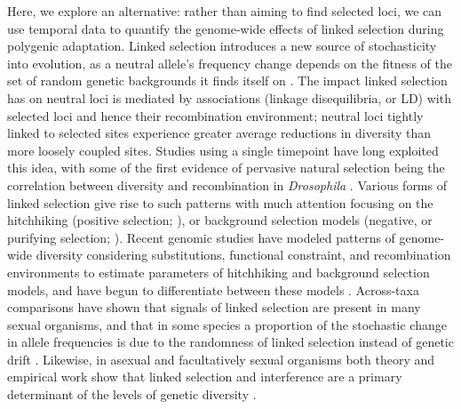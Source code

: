 \documentclass[11pt]{article}
\begin{document}
Here, we explore an alternative: rather than aiming to find selected loci, we
can use temporal data to quantify the genome-wide effects of linked selection
during polygenic adaptation. Linked selection introduces a new source of
stochasticity into evolution, as a neutral allele's frequency change depends on
the fitness of the set of random genetic backgrounds it finds itself on
\parencite{Gillespie2000-mh}. The impact linked selection has on neutral loci
is mediated by associations (linkage disequilibria, or LD) with selected loci
and hence their recombination environment; neutral loci tightly linked to
selected sites experience greater average reductions in diversity than more
loosely coupled sites. Studies using a single timepoint have long exploited
this idea, with some of the first evidence of pervasive natural selection being
the correlation between diversity and recombination in \emph{Drosophila}
\parencite{Aguade1989-jx,Begun1992-ey}. Various forms of linked selection give
rise to such patterns with much attention focusing on the hitchhiking (positive
selection; \cite{Maynard_Smith1974-lc}), or background selection models
(negative, or purifying selection; \cite{Charlesworth1993-gb,Hudson1995-xc}).
Recent genomic studies have modeled patterns of genome-wide diversity
considering substitutions, functional constraint, and recombination
environments to estimate parameters of hitchhiking and background selection
models, and have begun to differentiate between these models
\parencite{McVicker2009-ax,Hernandez2011-gs,Elyashiv2016-vt}.  Across-taxa
comparisons have shown that signals of linked selection are present in many
sexual organisms, and that in some species a proportion of the stochastic
change in allele frequencies is due to the randomness of linked selection
instead of genetic drift
\parencite{Cutter2013-ba,Corbett-Detig2015-gt,Coop2016-gx}. Likewise, in
asexual and facultatively sexual organisms both theory and empirical work show
that linked selection and interference are a primary determinant of the levels
of genetic diversity
\parencite{Neher2011-fy,Neher2013-dz,Good2017-om,Good2014-yz}.
\end{document}
